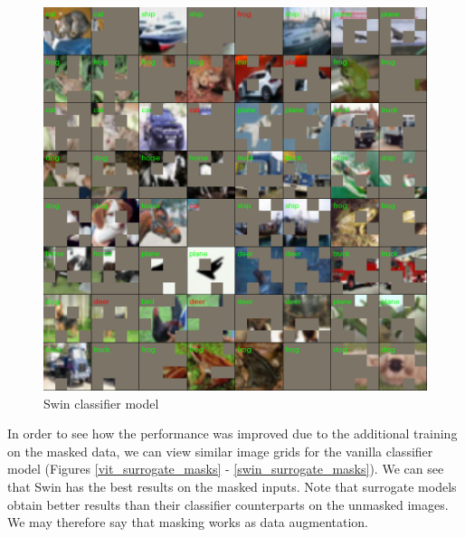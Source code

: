 \documentclass[en]{pracamgr}
\begin{document}
\begin{figure}[H]
\centering
\includegraphics[scale=0.5]{./images/swin_classifier_masks.png}
\caption{Swin classifier model}
\label{swin_classifier_masks}
\end{figure}




In order to see how the performance was improved due to the additional training on the masked data, we can view similar image grids for the vanilla classifier model (Figures \ref{vit_surrogate_masks} - \ref{swin_surrogate_masks}). We can see that Swin has the best results on the masked inputs. Note that surrogate models obtain better results than their classifier counterparts on the unmasked images. We may therefore say that masking works as data augmentation.
\end{document}
